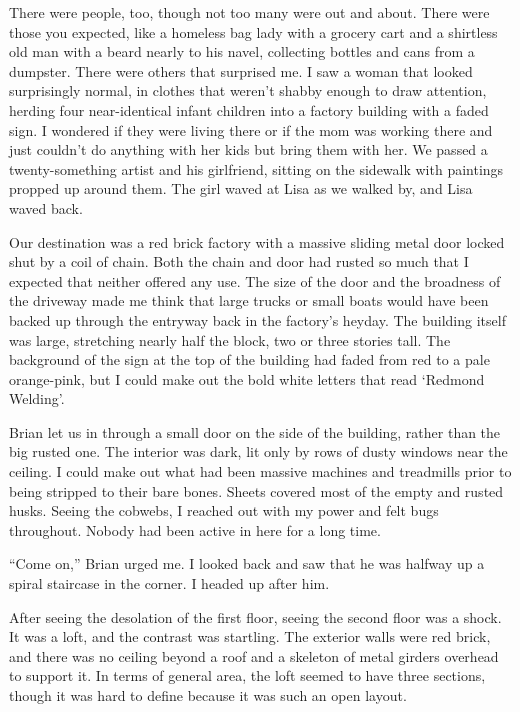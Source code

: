There were people, too, though not too many were out and about.  There were those you expected, like a homeless bag lady with a grocery cart and a shirtless old man with a beard nearly to his navel, collecting bottles and cans from a dumpster.  There were others that surprised me.  I saw a woman that looked surprisingly normal, in clothes that weren't shabby enough to draw attention, herding four near-identical infant children into a factory building with a faded sign.  I wondered if they were living there or if the mom was working there and just couldn't do anything with her kids but bring them with her.  We passed a twenty-something artist and his girlfriend, sitting on the sidewalk with paintings propped up around them.  The girl waved at Lisa as we walked by, and Lisa waved back.



Our destination was a red brick factory with a massive sliding metal door locked shut by a coil of chain.  Both the chain and door had rusted so much that I expected that neither offered any use.  The size of the door and the broadness of the driveway made me think that large trucks or small boats would have been backed up through the entryway back in the factory's heyday.  The building itself was large, stretching nearly half the block, two or three stories tall.  The background of the sign at the top of the building had faded from red to a pale orange-pink, but I could make out the bold white letters that read `Redmond Welding'.



Brian let us in through a small door on the side of the building, rather than the big rusted one.  The interior was dark, lit only by rows of dusty windows near the ceiling.  I could make out what had been massive machines and treadmills prior to being stripped to their bare bones.  Sheets covered most of the empty and rusted husks.  Seeing the cobwebs, I reached out with my power and felt bugs throughout.  Nobody had been active in here for a long time.



``Come on,'' Brian urged me.  I looked back and saw that he was halfway up a spiral staircase in the corner.  I headed up after him.



After seeing the desolation of the first floor, seeing the second floor was a shock.  It was a loft, and the contrast was startling.  The exterior walls were red brick, and there was no ceiling beyond a roof and a skeleton of metal girders overhead to support it.  In terms of general area, the loft seemed to have three sections, though it was hard to define because it was such an open layout.



